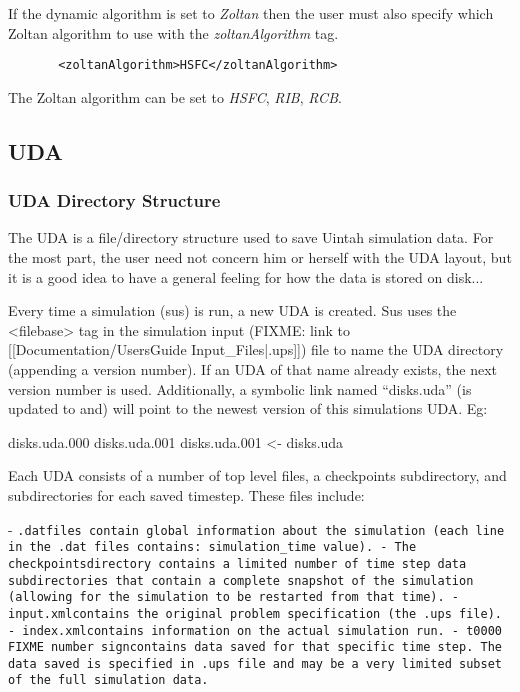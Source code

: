 If the dynamic algorithm is set to \emph{Zoltan} then the user must also specify which
Zoltan algorithm to use with the \emph{zoltanAlgorithm} tag.  

\begin{Verbatim}
       <zoltanAlgorithm>HSFC</zoltanAlgorithm>
\end{Verbatim}

The Zoltan algorithm can be set to \emph{HSFC}, \emph{RIB}, \emph{RCB}.

\subsection{UDA}

\subsubsection{UDA Directory Structure}

The UDA is a file/directory structure used to save Uintah simulation
data.  For the most part, the user need not concern him or herself
with the UDA layout, but it is a good idea to have a general feeling
for how the data is stored on disk...


Every time a simulation (sus) is run, a new UDA is created.  Sus uses
the <filebase> tag in the simulation input
(FIXME: link to [[Documentation/UsersGuide Input\_Files|.ups]]) file to name the UDA
directory (appending a version number).  If an UDA of that name
already exists, the next version number is used.  Additionally, a
symbolic link named ``disks.uda'' (is updated to and) will point to
the newest version of this simulations UDA.  Eg:

disks.uda.000
disks.uda.001
disks.uda.001 <- disks.uda


Each UDA consists of a number of top level files, a checkpoints
subdirectory, and subdirectories for each saved timestep.  These files
include:

- \tt.dat\normalfont files contain global information about the simulation
(each line in the .dat files contains: simulation\_time value).
- The \tt checkpoints\normalfont directory contains a limited number of time
step data subdirectories that contain a complete snapshot of the
simulation (allowing for the simulation to be restarted from that
time).
- \tt input.xml\normalfont contains the original problem specification (the
.ups file).
- \tt index.xml\normalfont contains information on the actual simulation run.
- \tt t0000 FIXME number sign\normalfont contains data saved for that specific time step.  The
data saved is specified in .ups file and may be a very limited subset
of the full simulation data.

